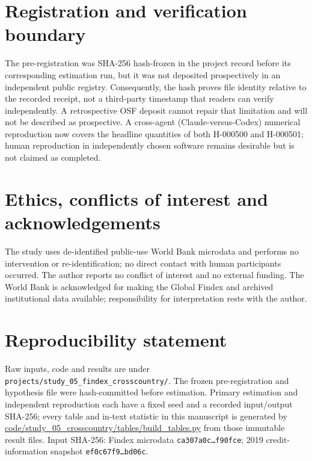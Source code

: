 \section*{Registration and verification boundary}

The pre-registration was SHA-256 hash-frozen in the project record before its corresponding
estimation run, but it was not deposited prospectively in an independent public registry.
Consequently, the hash proves file identity relative to the recorded receipt, not a third-party
timestamp that readers can verify independently. A retrospective OSF deposit cannot repair that
limitation and will not be described as prospective. A cross-agent (Claude-versus-Codex)
numerical reproduction now covers the headline quantities of both H-000500 and H-000501; human
reproduction in independently chosen software remains desirable but is not claimed as
completed.

\section*{Ethics, conflicts of interest and acknowledgements}

The study uses de-identified public-use World Bank microdata and performs no intervention or
re-identification; no direct contact with human participants occurred. The author reports no
conflict of interest and no external funding. The World Bank is acknowledged for making the
Global Findex and archived institutional data available; responsibility for interpretation rests
with the author.

\section*{Reproducibility statement}

Raw inputs, code and results are under \texttt{projects/study\_05\_findex\_crosscountry/}.
The frozen pre-registration and hypothesis file were hash-committed before estimation.
Primary estimation and independent reproduction each have a fixed seed and a recorded
input/output SHA-256; every table and in-text statistic in this manuscript is generated by
\url{code/study_05_crosscountry/tables/build_tables.py} from those immutable result
files. Input SHA-256: Findex microdata \texttt{ca307a0c\ldots f90fce}; 2019
credit-information snapshot \texttt{ef0c67f9\ldots bd06c}.
